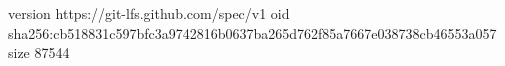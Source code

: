 version https://git-lfs.github.com/spec/v1
oid sha256:cb518831c597bfc3a9742816b0637ba265d762f85a7667e038738cb46553a057
size 87544
